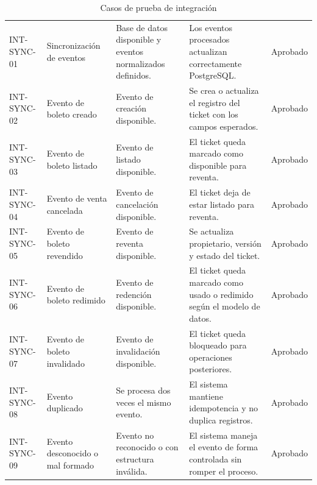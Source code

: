\documentclass[12pt,letterpaper]{article}
\begin{document}
\begin{table}[H]
\centering
\begingroup
\scriptsize
\setlength{\tabcolsep}{2.5pt}
\renewcommand{\arraystretch}{1.18}

\begin{tabularx}{\textwidth}{|
>{\raggedright\arraybackslash}p{2.5cm}|
>{\raggedright\arraybackslash}p{3.2cm}|
>{\raggedright\arraybackslash}X|
>{\raggedright\arraybackslash}p{3.6cm}|
>{\centering\arraybackslash}p{1.5cm}|}
\hline
\multicolumn{1}{|>{\centering\arraybackslash}m{2.5cm}|}{\textbf{ID}} &
\multicolumn{1}{>{\centering\arraybackslash}m{3.2cm}|}{\textbf{Caso}} &
\multicolumn{1}{>{\centering\arraybackslash}m{3.5cm}|}{\textbf{Precondiciones}} &
\multicolumn{1}{>{\centering\arraybackslash}m{3.6cm}|}{\textbf{Resultado esperado}} &
\multicolumn{1}{>{\centering\arraybackslash}m{1.5cm}|}{\textbf{Estado}} \\
\hline
INT-SYNC-01 & Sincronización de eventos & Base de datos disponible y eventos normalizados definidos. & Los eventos procesados actualizan correctamente PostgreSQL. & Aprobado \\
\hline
INT-SYNC-02 & Evento de boleto creado & Evento de creación disponible. & Se crea o actualiza el registro del ticket con los campos esperados. & Aprobado \\
\hline
INT-SYNC-03 & Evento de boleto listado & Evento de listado disponible. & El ticket queda marcado como disponible para reventa. & Aprobado \\
\hline
INT-SYNC-04 & Evento de venta cancelada & Evento de cancelación disponible. & El ticket deja de estar listado para reventa. & Aprobado \\
\hline
INT-SYNC-05 & Evento de boleto revendido & Evento de reventa disponible. & Se actualiza propietario, versión y estado del ticket. & Aprobado \\
\hline
INT-SYNC-06 & Evento de boleto redimido & Evento de redención disponible. & El ticket queda marcado como usado o redimido según el modelo de datos. & Aprobado \\
\hline
INT-SYNC-07 & Evento de boleto invalidado & Evento de invalidación disponible. & El ticket queda bloqueado para operaciones posteriores. & Aprobado \\
\hline
INT-SYNC-08 & Evento duplicado & Se procesa dos veces el mismo evento. & El sistema mantiene idempotencia y no duplica registros. & Aprobado \\
\hline
INT-SYNC-09 & Evento desconocido o mal formado & Evento no reconocido o con estructura inválida. & El sistema maneja el evento de forma controlada sin romper el proceso. & Aprobado \\
\hline
\end{tabularx}

\endgroup
\caption{Casos de prueba de integración}
\label{tab:casos-prueba-integracion}
\end{table}
\end{document}

